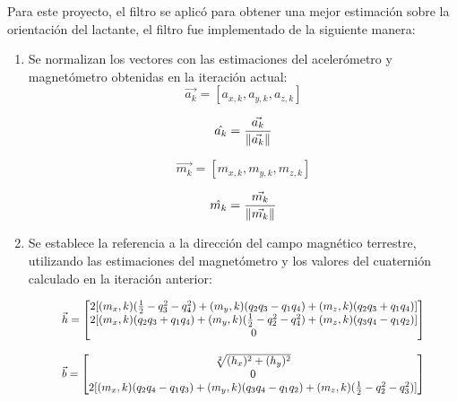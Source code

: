     Para este proyecto, el filtro se aplicó para obtener una mejor estimación sobre la orientación del lactante, el filtro fue implementado de la siguiente manera:

    \begin{enumerate}
        \item Se normalizan los vectores con las estimaciones del acelerómetro y magnetómetro obtenidas en la iteración actual:
        \begin{equation}
             \vec{a_k} = [a_{x,k}, a_{y,k}, a_{z,k}]  
        \end{equation}

        \begin{equation}
            \hat{a_k} = \frac{\vec{a_k}}{\lVert\vec{a_k}\rVert}  
        \end{equation}

        \begin{equation}
            \vec{m_k} = [m_{x,k}, m_{y,k}, m_{z,k}] 
        \end{equation}

        \begin{equation}
            \hat{m_k} = \frac{\vec{m_k}}{\lVert\vec{m_k}\rVert} 
        \end{equation}
            
        
        \item Se establece la referencia a la dirección del campo magnético terrestre, utilizando las estimaciones del magnetómetro y los valores del cuaternión calculado en la iteración anterior:
        
        \begin{equation}
            \resizebox{0.84\hsize}{!}{$
            \vec{h} = 
                \begin{bmatrix}
                    2[(m_x,k)(\frac{1}{2} - q^2_3 - q^2_4 ) + (m_y,k)(q_2q_3 - q_1q_4) + (m_z,k)(q_2q_3 + q_1q_4)] \\
                    2[(m_x,k)(q_2q_3 + q_1q_4) + (m_y,k)(\frac{1}{2} - q^2_2 - q^2_4 ) + (m_z,k)(q_3q_4 - q_1q_2)] \\
                    0 
                \end{bmatrix} 
            $}    
        \end{equation}
        
        
        \begin{equation}
        \resizebox{0.84\hsize}{!}{$
            \vec{b} = 
                \begin{bmatrix}
                    \sqrt[2]{(h_x)^2+(h_y)^2}  \\
                    0 \\
                    2[(m_x,k)(q_2q_4 - q_1q_3) + (m_y,k)(q_3q_4 - q_1q_2) + (m_z,k)(\frac{1}{2} - q^2_2 - q^2_3 )] 
                \end{bmatrix} 
            $}
        \end{equation}
            

\end{enumerate}
